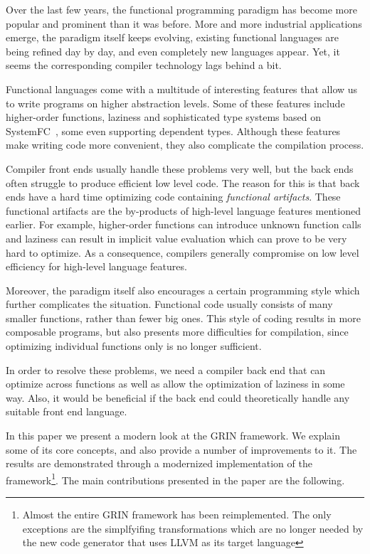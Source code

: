 \documentclass[main.tex]{subfiles}
\begin{document}
	
	Over the last few years, the functional programming paradigm has become more popular and prominent than it was before. More and more industrial applications emerge, the paradigm itself keeps evolving, existing functional languages are being refined day by day, and even completely new languages appear. Yet, it seems the corresponding compiler technology lags behind a bit.
	
	Functional languages come with a multitude of interesting features that allow us to write programs on higher abstraction levels. Some of these features include higher-order functions, laziness and sophisticated type systems based on SystemFC~\cite{systemfc}, some even supporting dependent types. Although these features make writing code more convenient, they also complicate the compilation process.
	
	Compiler front ends usually handle these problems very well, but the back ends often struggle to produce efficient low level code. The reason for this is that back ends have a hard time optimizing code containing \emph{functional artifacts}. These functional artifacts are the by-products of high-level language features mentioned earlier. For example, higher-order functions can introduce unknown function calls and laziness can result in implicit value evaluation which can prove to be very hard to optimize. As a consequence, compilers generally compromise on low level efficiency for high-level language features.
	
	Moreover, the paradigm itself also encourages a certain programming style which further complicates the situation. Functional code usually consists of many smaller functions, rather than fewer big ones. This style of coding results in more composable programs, but also presents more difficulties for compilation, since optimizing individual functions only is no longer sufficient. 
	
	In order to resolve these problems, we need a compiler back end that can optimize across functions as well as allow the optimization of laziness in some way. Also, it would be beneficial if the back end could theoretically handle any suitable front end language.
	
	In this paper we present a modern look at the GRIN framework. We explain some of its core concepts, and also provide a number of improvements to it. The results are demonstrated through a modernized implementation of the framework\footnote{Almost the entire GRIN framework has been reimplemented. The only exceptions are the simplfyifing transformations which are no longer needed by the new code generator that uses LLVM as its target language}. The main contributions presented in the paper are the following.
	
\end{document}
